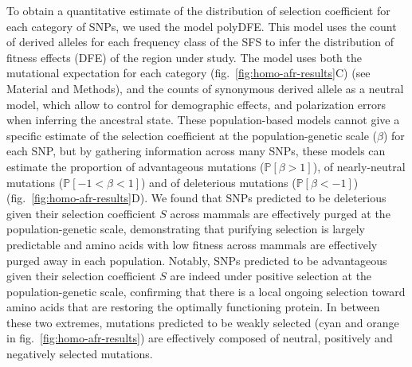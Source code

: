 \documentclass{article}
\newcommand{\proba}{\mathbb{P}}
\newcommand{\Sphy}{S}
\newcommand{\Spop}{\beta}
\newcommand{\polyDel}{\Spop < -1}
\newcommand{\polyNeutral}{-1 < \Spop < 1}
\newcommand{\polyAdv}{ \Spop > 1}
\newcommand{\PpolyDel}{\proba \left[ \polyDel \right]}
\newcommand{\PpolyNeutral}{\proba \left[ \polyNeutral \right]}
\newcommand{\PpolyAdv}{\proba \left[ \polyAdv \right]}
\begin{document}
    To obtain a quantitative estimate of the distribution of selection coefficient for each category of SNPs, we used the model polyDFE\cite{tataru_inference_2017, tataru_polydfe_2020}.
    This model uses the count of derived alleles for each frequency class of the SFS to infer the distribution of fitness effects (DFE) of the region under study.
    The model uses both the mutational expectation for each category (fig.~\ref{fig:homo-afr-results}C) (see Material and Methods), and the counts of synonymous derived allele as a neutral model, which allow to control for demographic effects, and polarization errors when inferring the ancestral state.
    These population-based models cannot give a specific estimate of the selection coefficient at the population-genetic scale ($\Spop$) for each SNP, but by gathering information across many SNPs, these models can estimate the proportion of advantageous mutations ($\PpolyAdv$), of nearly-neutral mutations ($\PpolyNeutral$) and of deleterious mutations ($\PpolyDel$) (fig.~\ref{fig:homo-afr-results}D).
    We found that SNPs predicted to be deleterious given their selection coefficient $\Sphy$ across mammals are effectively purged at the population-genetic scale, demonstrating that purifying selection is largely predictable and amino acids with low fitness across mammals are effectively purged away in each population.
    Notably, SNPs predicted to be advantageous given their selection coefficient $\Sphy$ are indeed under positive selection at the population-genetic scale, confirming that there is a local ongoing selection toward amino acids that are restoring the optimally functioning protein.
    In between these two extremes, mutations predicted to be weakly selected (cyan and orange in fig.~\ref{fig:homo-afr-results}) are effectively composed of neutral, positively and negatively selected mutations.
\end{document}
